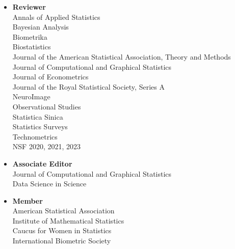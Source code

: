 \documentclass[11pt]{article}
\newcommand{\tab}{\hspace*{2em}}
\begin{document}
\begin{itemize}
	\item[] \textbf{Reviewer}  \\
	\tab Annals of Applied Statistics \\ 
	\tab Bayesian Analysis \\
	\tab Biometrika \\
	\tab Biostatistics \\
	\tab Journal of the American Statistical Association, Theory and Methods \\
	\tab Journal of Computational and Graphical Statistics \\ 
	\tab Journal of Econometrics \\
	\tab Journal of the Royal Statistical Society, Series A \\
	\tab NeuroImage \\
	\tab Observational Studies \\
	\tab Statistica Sinica \\
	\tab Statistics Surveys \\ 
	\tab Technometrics \\
	\tab NSF 2020, 2021, 2023 \vspace{-2mm}
	\item[] \textbf{Associate Editor}  \\
	\tab Journal of Computational and Graphical Statistics \\
	\tab  Data Science in Science \vspace{-2mm}
	\item[] \textbf{Member} \\
	\tab American Statistical Association \\
	\tab  Institute of Mathematical Statistics \\
	\tab Caucus for Women in Statistics \\
	\tab  International Biometric Society 
\end{itemize}
\end{document}

